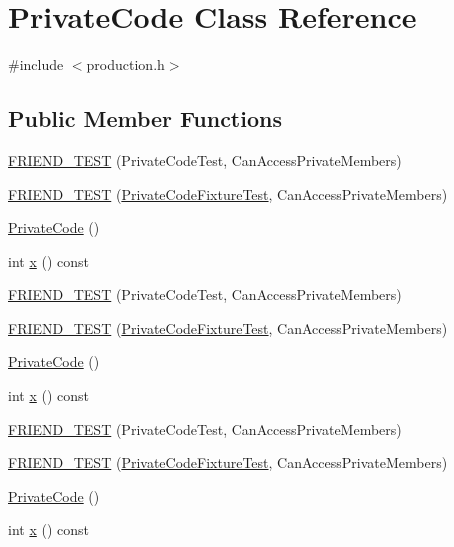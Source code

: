 \hypertarget{class_private_code}{}\section{Private\+Code Class Reference}
\label{class_private_code}


{\ttfamily \#include $<$production.\+h$>$}

\subsection*{Public Member Functions}
\begin{DoxyCompactItemize}
\item 
\mbox{\hyperlink{class_private_code_a9a74a333501232539ab1636f0928d8f2}{F\+R\+I\+E\+N\+D\+\_\+\+T\+E\+ST}} (Private\+Code\+Test, Can\+Access\+Private\+Members)
\item 
\mbox{\hyperlink{class_private_code_a29b6823300f68d78691476eeeaed8a7c}{F\+R\+I\+E\+N\+D\+\_\+\+T\+E\+ST}} (\mbox{\hyperlink{googletest-master_2googletest_2test_2gtest__prod__test_8cc_a89debba10c803e339ce0f9b0b34a2267}{Private\+Code\+Fixture\+Test}}, Can\+Access\+Private\+Members)
\item 
\mbox{\hyperlink{class_private_code_affe538411a99919d24ef09dffe1bb3eb}{Private\+Code}} ()
\item 
int \mbox{\hyperlink{class_private_code_a247781246ce4d0c66563eaa39ba5aaa9}{x}} () const
\item 
\mbox{\hyperlink{class_private_code_a9a74a333501232539ab1636f0928d8f2}{F\+R\+I\+E\+N\+D\+\_\+\+T\+E\+ST}} (Private\+Code\+Test, Can\+Access\+Private\+Members)
\item 
\mbox{\hyperlink{class_private_code_a29b6823300f68d78691476eeeaed8a7c}{F\+R\+I\+E\+N\+D\+\_\+\+T\+E\+ST}} (\mbox{\hyperlink{googletest-master_2googletest_2test_2gtest__prod__test_8cc_a89debba10c803e339ce0f9b0b34a2267}{Private\+Code\+Fixture\+Test}}, Can\+Access\+Private\+Members)
\item 
\mbox{\hyperlink{class_private_code_affe538411a99919d24ef09dffe1bb3eb}{Private\+Code}} ()
\item 
int \mbox{\hyperlink{class_private_code_a247781246ce4d0c66563eaa39ba5aaa9}{x}} () const
\item 
\mbox{\hyperlink{class_private_code_a9a74a333501232539ab1636f0928d8f2}{F\+R\+I\+E\+N\+D\+\_\+\+T\+E\+ST}} (Private\+Code\+Test, Can\+Access\+Private\+Members)
\item 
\mbox{\hyperlink{class_private_code_a29b6823300f68d78691476eeeaed8a7c}{F\+R\+I\+E\+N\+D\+\_\+\+T\+E\+ST}} (\mbox{\hyperlink{googletest-master_2googletest_2test_2gtest__prod__test_8cc_a89debba10c803e339ce0f9b0b34a2267}{Private\+Code\+Fixture\+Test}}, Can\+Access\+Private\+Members)
\item 
\mbox{\hyperlink{class_private_code_affe538411a99919d24ef09dffe1bb3eb}{Private\+Code}} ()
\item 
int \mbox{\hyperlink{class_private_code_a247781246ce4d0c66563eaa39ba5aaa9}{x}} () const
\end{DoxyCompactItemize}
